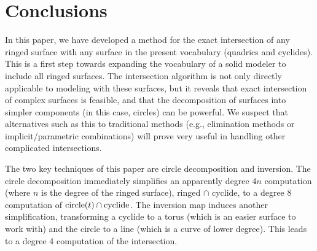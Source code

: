 {%




%
%
%

} %


% 

\section{Conclusions}
\label{sec:conc}

In this paper, we have developed a method for the exact intersection of any
ringed surface with any surface in the present vocabulary (quadrics and
cyclides).
This is a first step towards expanding the vocabulary 
of a solid modeler to include all ringed surfaces.
The intersection algorithm is not only directly applicable 
to modeling with these surfaces,
but it reveals that exact intersection of complex surfaces is feasible,
and that the decomposition of surfaces into simpler components
(in this case, circles) can be powerful.
We suspect that alternatives such as this to 
traditional methods (e.g., elimination methods or implicit/parametric
combinations) will prove very useful in handling other complicated
intersections.

The two key techniques of this paper are circle decomposition and inversion.
The circle decomposition immediately simplifies an apparently degree $4n$
computation (where $n$ is the degree of the ringed surface),
ringed $\cap$ cyclide, 
to a degree 8 computation of ${\rm circle}(t) \cap {\rm cyclide}$.
The inversion map induces another simplification,
transforming a cyclide to a torus (which is an easier surface to work with)
and the circle to a line (which is a curve of lower degree).
This leads to a degree 4 computation of the intersection.

